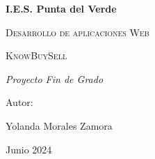 \documentclass{report}
\begin{document}
\begin{titlepage}
\centering
{\bfseries\LARGE I.E.S. Punta del Verde \par}
\vspace{1cm}
{\scshape\Large Desarrollo de aplicaciones Web \par}
\vspace{3cm}
{\scshape\Huge  KnowBuySell \par}
\vspace{3cm}
{\itshape\Large Proyecto Fin de Grado \par}
\vfill
{\Large Autor: \par}
{\Large Yolanda Morales Zamora \par}
\vfill
{\Large Junio 2024 \par}
\end{titlepage}
\end{document}
